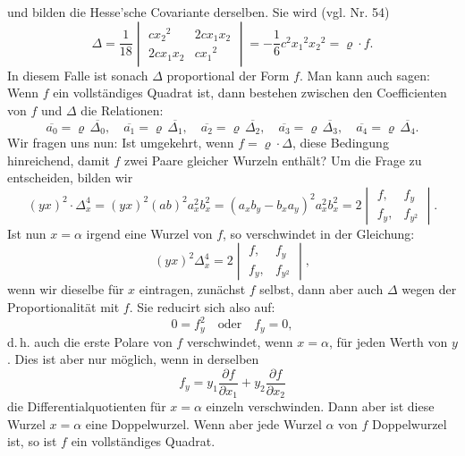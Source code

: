 \documentclass[11pt]{article}
\providecommand{\weberpage}[1]{}
\providecommand{\weq}[2]{\begin{equation}\tag{#1}#2\end{equation}}
\let\Delta\varDelta
\begin{document}
\weberpage{197}
und bilden die Hesse'sche Covariante derselben. Sie wird (vgl. Nr. 54)
\[
\Delta=\frac{1}{18}\begin{vmatrix}cx_2{}^2 & 2cx_1x_2\\ 2cx_1x_2 & cx_1{}^2\end{vmatrix}=-\frac{1}{6}c^2x_1{}^2x_2{}^2=\varrho\cdot f.
\]
In diesem Falle ist sonach $\Delta$ proportional der Form $f$. Man kann auch sagen: Wenn $f$ ein vollständiges Quadrat ist, dann bestehen zwischen den Coefficienten von $f$ und $\Delta$ die Relationen:
\[
\overline{a_0}=\varrho\,\overline{\Delta_0},\quad \overline{a_1}=\varrho\,\overline{\Delta_1},\quad \overline{a_2}=\varrho\,\overline{\Delta_2},\quad \overline{a_3}=\varrho\,\overline{\Delta_3},\quad \overline{a_4}=\varrho\,\overline{\Delta_4}.
\]
Wir fragen uns nun: Ist umgekehrt, wenn $f=\varrho\cdot\Delta$, diese Bedingung hinreichend, damit $f$ zwei Paare gleicher Wurzeln enthält? Um die Frage zu entscheiden, bilden wir
\[
(yx)^2\cdot\Delta_x^4=(yx)^2(ab)^2a_x^2b_x^2=(a_xb_y-b_xa_y)^2a_x^2b_x^2=2\begin{vmatrix}f, & f_y\\ f_y, & f_{y^2}\end{vmatrix}.
\]
Ist nun $x=\alpha$ irgend eine Wurzel von $f$, so verschwindet in der Gleichung:
\weq{I}{(yx)^2\Delta_x^4=2\begin{vmatrix}f, & f_y\\ f_y, & f_{y^2}\end{vmatrix},}
wenn wir dieselbe für $x$ eintragen, zunächst $f$ selbst, dann aber auch $\Delta$ wegen der Proportionalität mit $f$. Sie reducirt sich also auf:
\[
0=f_y^2\quad\text{oder}\quad f_y=0,
\]
d.\,h. auch die erste Polare von $f$ verschwindet, wenn $x=\alpha$, für jeden Werth von $y$. Dies ist aber nur möglich, wenn in derselben
\[
f_y=y_1\frac{\partial f}{\partial x_1}+y_2\frac{\partial f}{\partial x_2}
\]
die Differentialquotienten für $x=\alpha$ einzeln verschwinden. Dann aber ist diese Wurzel $x=\alpha$ eine Doppelwurzel. Wenn aber jede Wurzel $\alpha$ von $f$ Doppelwurzel ist, so ist $f$ ein vollständiges Quadrat.
\end{document}
